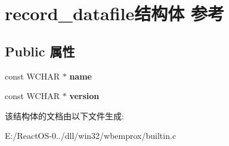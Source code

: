 \hypertarget{structrecord__datafile}{}\section{record\+\_\+datafile结构体 参考}
\label{structrecord__datafile}
\subsection*{Public 属性}
\begin{DoxyCompactItemize}
\item 
\mbox{\label{structrecord__datafile_ab2b1791ce2293055516e8c4a925f6faf}} 
const W\+C\+H\+AR $\ast$ {\bfseries name}
\item 
\mbox{\label{structrecord__datafile_ade0b4105e49de9e85b25993619be6866}} 
const W\+C\+H\+AR $\ast$ {\bfseries version}
\end{DoxyCompactItemize}


该结构体的文档由以下文件生成\+:\begin{DoxyCompactItemize}
\item 
E\+:/\+React\+O\+S-\/0../dll/win32/wbemprox/builtin.\+c\end{DoxyCompactItemize}

